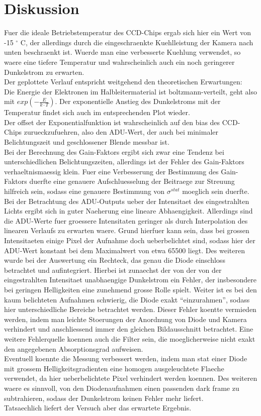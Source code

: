 \section{Diskussion}
Fuer die ideale Betriebstemperatur des CCD-Chips ergab sich hier ein Wert von -15 $^\circ$ C, der allerdings durch die eingeschraenkte Kuehlleistung der Kamera nach unten beschraenkt ist. Wuerde man eine verbesserte Kuehlung verwendet, so waere eine tiefere Temperatur und wahrscheinlich auch ein noch geringerer Dunkelstrom zu erwarten. \\
Der geplottete Verlauf entspricht weitgehend den theoretischen Erwartungen: \\
Die Energie der Elektronen im Halbleitermaterial ist boltzmann-verteilt, geht also mit $exp(-\frac{E}{k \cdot T})$. Der exponentielle Anstieg des Dunkelstroms mit der Temperatur findet sich auch im entsprechenden Plot wieder. \\
Der offset der Exponentialfunktion ist wahrscheinlich auf den bias des CCD-Chips zurueckzufuehren, also den ADU-Wert, der auch bei minimaler Belichtungszeit und geschlossener Blende messbar ist. \\
Bei der Berechnung des Gain-Faktors ergibt sich zwar eine Tendenz bei unterschiedlichen Belichtungszeiten, allerdings ist der Fehler des Gain-Faktors verhaeltnismaessig klein. Fuer eine Verbesserung der Bestimmung des Gain-Faktors duerfte eine genauere Aufschluesselung der Beitraege zur Streuung hilfreich sein, sodass eine genauere Bestimmung von $\sigma^{stat}$ moeglich sein duerfte. \\
Bei der Betrachtung des ADU-Outputs ueber der Intensitaet des eingestrahlten Lichts ergibt sich in guter Naeherung eine lineare Abhaengigkeit. Allerdings sind die ADU-Werte fuer groessere Intensitaten geringer als durch Interpolation des linearen Verlaufs zu erwarten waere. Grund hierfuer kann sein, dass bei grossen Intensitaeten einige Pixel der Aufnahme doch ueberbelichtet sind, sodass hier der ADU-Wert konstant bei dem Maximalwert von etwa 65500 liegt. Des weiteren wurde bei der Auswertung ein Rechteck, das genau die Diode einschloss betrachtet und aufintegriert. Hierbei ist zunaechst der von der von der eingestrahlten Intensitaet unabhaengige Dunkelstrom ein Fehler, der insbesondere bei geringen Helligkeiten eine zunehmend grosse Rolle spielt. Weiter ist es bei den kaum belichteten Aufnahmen schwierig, die Diode exakt \enquote{einzurahmen}, sodass hier unterschiedliche Bereiche betrachtet werden. Dieser Fehler koentte vermieden werden, indem man leichte Stoerungen der Anordnung von Diode und Kamera verhindert und anschliessend immer den gleichen Bildausschnitt betrachtet. Eine weitere Fehlerquelle koennen auch die Filter sein, die moeglicherweise nicht exakt den angegebenen Absorptionsgrad aufweisen. \\
Eventuell koennte die Messung verbessert werden, indem man stat einer Diode mit grossem Helligkeitsgradienten eine homogen ausgeleuchtete Flaeche verwendet, da hier ueberbelichtete Pixel verhindert werden koennen. Des weiteren waere es sinnvoll, von den Diodenaufnahmen einen passenden dark frame zu subtrahieren, sodass der Dunkelstrom keinen Fehler mehr liefert. \\
Tatsaechlich liefert der Versuch aber das erwartete Ergebnis. 